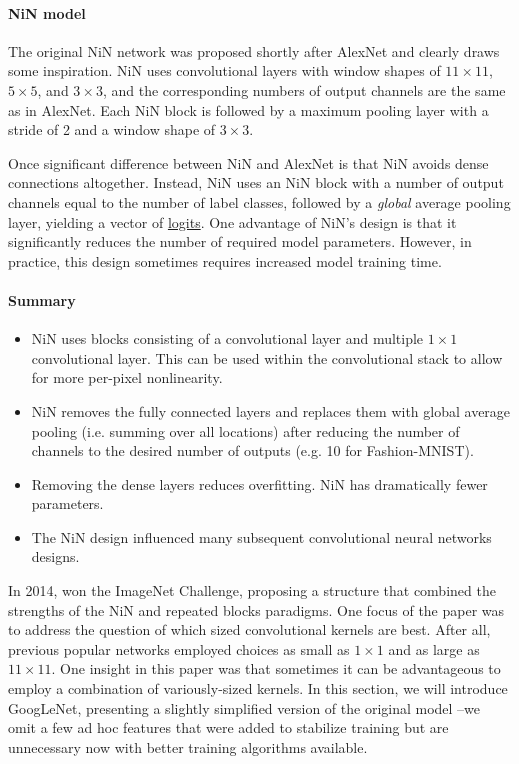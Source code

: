\paragraph{NiN model}

The original NiN network was proposed shortly after AlexNet and clearly draws some inspiration. NiN uses convolutional layers with window shapes of $11\times 11$, $5\times 5$, and $3\times 3$, and the corresponding numbers of output channels are the same as in AlexNet. Each NiN block is followed by a maximum pooling layer with a stride of 2 and a window shape of $3\times 3$.

Once significant difference between NiN and AlexNet is that NiN avoids dense connections altogether. Instead, NiN uses an NiN block with a number of output channels equal to the number of label classes, followed by a \textit{global} average pooling layer, yielding a vector of \href{https://en.wikipedia.org/wiki/Logit}{logits}. One advantage of NiN's design is that it significantly reduces the number of required model parameters. However, in practice, this design sometimes requires increased model training time.

\paragraph{Summary}

\begin{itemize}
    \item NiN uses blocks consisting of a convolutional layer and multiple $1\times 1$ convolutional layer. This can be used within the convolutional stack to allow for more per-pixel nonlinearity.
    \item NiN removes the fully connected layers and replaces them with global average pooling (i.e. summing over all locations) after reducing the number of channels to the desired number of outputs (e.g. 10 for Fashion-MNIST).
    \item Removing the dense layers reduces overfitting. NiN has dramatically fewer parameters.
    \item The NiN design influenced many subsequent convolutional neural networks designs.
\end{itemize}

\label{cnn:googlenet}

In 2014, \citet{Szegedy2015} won the ImageNet Challenge, proposing a structure that combined the strengths of the NiN and repeated blocks paradigms. One focus of the paper was to address the question of which sized convolutional kernels are best. After all, previous popular networks employed choices as small as $1 \times 1$ and as large as $11 \times 11$. One insight in this paper was that sometimes it can be advantageous to employ a combination of variously-sized kernels. In this section, we will introduce GoogLeNet, presenting a slightly simplified version of the original model --we omit a few ad hoc features that were added to stabilize training
but are unnecessary now with better training algorithms available. 

